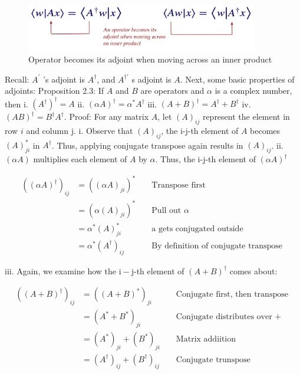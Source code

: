 \documentclass[main.tex]{subfiles}
\begin{document}
    \begin{figure}
        \centering
        \includegraphics[width=4in]{notes/figs/n04/17adjoint.png}
        \caption{Operator becomes its adjoint when moving across an inner product}
        \label{fig:17adjoint.png}
    \end{figure}
    
    Recall: $A^{\prime}$ 's adjoint is $A^{\dagger}$, and $A^{\dagger \prime}$ s adjoint is $A$. Next, some basic properties of adjoints: Proposition 2.3: If $A$ and $B$ are operators and $\alpha$ is a complex number, then i. $\left(A^{\dagger}\right)^{\dagger}=A$ ii. $(\alpha A)^{\dagger}=\alpha^{*} A^{\dagger}$ iii. $(A+B)^{\dagger}=A^{\dagger}+B^{\dagger}$ iv. $(A B)^{\dagger}=B^{\dagger} A^{\dagger}$. Proof: For any matrix $A$, let $(A)_{i j}$ represent the element in row $i$ and column $\mathrm{j}$. i. Observe that $(A)_{i j}$, the i-j-th element of $A$ becomes $(A)_{j i}^{*}$ in $A^{\dagger}$. Thus, applying conjugate transpose again results in $(A)_{i j}$. ii. $(\alpha A)$ multiplies each element of $A$ by $\alpha$. Thus, the i-j-th element of $(\alpha A)^{\dagger}$

    $$
    \begin{aligned}
    \left((\alpha A)^{\dagger}\right)_{i j} &=\left((\alpha A)_{j i}\right)^{*} & & \text { Transpose first } \\
    &=\left(\alpha(A)_{j i}\right)^{*} & & \text { Pull out } \alpha \\
    &=\alpha^{*}(A)_{j i}^{*} & & \text { a gets conjugated outside } \\
    &=\alpha^{*}\left(A^{\dagger}\right)_{i j} & & \text { By definition of conjugate transpose }
    \end{aligned}
    $$
    
    iii. Again, we examine how the $\mathrm{i}-\mathrm{j}$-th element of $(A+B)^{\dagger}$ comes about:
    
    $$
    \begin{aligned}
    \left((A+B)^{\dagger}\right)_{i j} &=\left((A+B)^{*}\right)_{j i} & & \text { Conjugate first, then transpose } \\
    &=\left(A^{*}+B^{*}\right)_{j i} & & \text { Conjugate distributes over }+\\
    &=\left(A^{*}\right)_{j i}+\left(B^{*}\right)_{j i} & & \text { Matrix addiition } \\
    &=\left(A^{\dagger}\right)_{i j}+\left(B^{\dagger}\right)_{i j} & & \text { Conjugate trunspose }
    \end{aligned}
    $$
    
\end{document}
